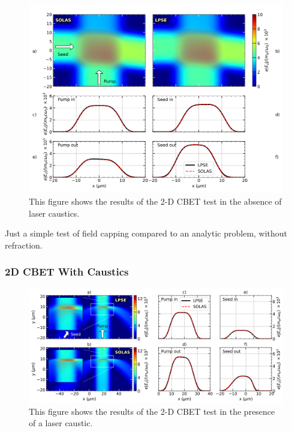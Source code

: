 \begin{figure}[t!]
    \includegraphics[width=1.0\linewidth]{Numerics/Images/CBET_test_nocaustics.png}
    \centering
    \caption{This figure shows the results of the 2-D \ac{CBET} test in the absence of laser caustics.}%
    \label{fig:SOLAS_CBET_test_nocaustics}
\end{figure}

Just a simple test of field capping compared to an analytic problem, without refraction.

\subsubsection{2D CBET With Caustics}%
\label{sec:SOLAS_CBET_caustic_test}

\begin{figure}[t!]
    \includegraphics[width=1.0\linewidth]{Numerics/Images/caustic_CBET_test.png}
    \centering
    \caption{This figure shows the results of the 2-D \ac{CBET} test in the presence of a laser caustic.}%
    \label{fig:SOLAS_CBET_test_caustics}
\end{figure}

